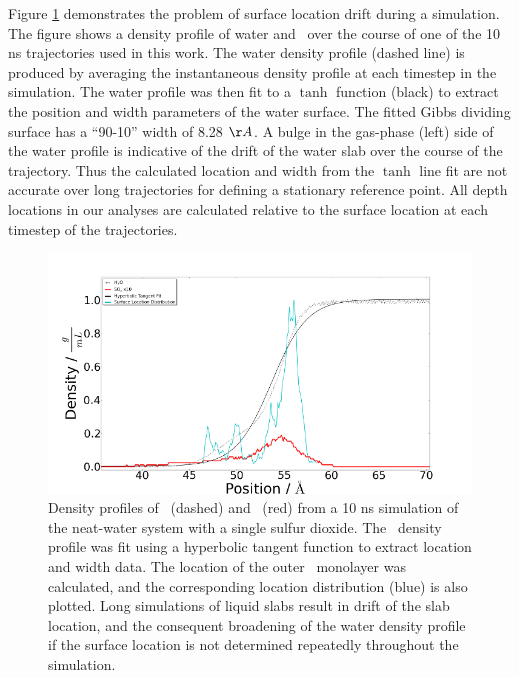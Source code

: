 Figure \ref{fig:density-flaw} demonstrates the problem of surface location drift during a simulation. The figure shows a density profile of water and \suldiox~over the course of one of the 10 ns trajectories used in this work. The water density profile (dashed line) is produced by averaging the instantaneous density profile at each timestep in the simulation. The water profile was then fit to a $\tanh$ function (black) to extract the position and width parameters of the water surface. The fitted Gibbs dividing surface has a ``90-10'' width of 8.28 $\AA$. A bulge in the gas-phase (left) side of the water profile is indicative of the drift of the water slab over the course of the trajectory. Thus the calculated location and width from the $\tanh$ line fit are not accurate over long trajectories for defining a stationary reference point. All depth locations in our analyses are calculated relative to the surface location at each timestep of the trajectories.

\begin{figure}[h!]
	\begin{center}
		\includegraphics[scale=1.0]{images/density/Density+SurfaceLocation-flawed.png}
		\caption{Density profiles of \wat~(dashed) and \suldiox~(red) from a 10 ns simulation of the neat-water system with a single sulfur dioxide. The \wat~density profile was fit using a hyperbolic tangent function to extract location and width data. The location of the outer \wat~monolayer was calculated, and the corresponding location distribution (blue) is also plotted. Long simulations of liquid slabs result in drift of the slab location, and the consequent broadening of the water density profile if the surface location is not determined repeatedly throughout the simulation.}
		\label{fig:density-flaw}
	\end{center}
\end{figure}

